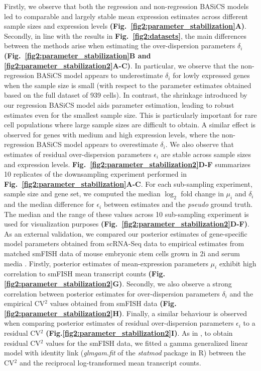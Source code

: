 Firstly, we observe that both the regression and non-regression BASiCS models led to comparable and largely stable mean expression estimates across different sample sizes and expression levels \textbf{(Fig.~\ref{fig2:parameter_stabilization}A)}. Secondly, in line with the results in \textbf{Fig.~\ref{fig2:datasets}}, the main differences between the methods arise when estimating the over-dispersion parameters $\delta_i$ \textbf{(Fig.~\ref{fig2:parameter_stabilization}B and \ref{fig2:parameter_stabilization2}A-C)}. In particular, we observe that the non-regression BASiCS model appears to underestimate $\delta_i$ for lowly expressed genes when the sample size is small (with respect to the parameter estimates obtained based on the full dataset of 939 cells). In contrast, the shrinkage introduced by our regression BASiCS model aids parameter estimation, leading to robust estimates even for the smallest sample size. This is particularly important for rare cell populations where large sample sizes are difficult to obtain. A similar effect is observed for genes with medium and high expression levels, where the non-regression BASiCS model appears to overestimate $\delta_i$. We also observe that estimates of residual over-dispersion parameters $\epsilon_i$ are stable across sample sizes and expression levels. \textbf{Fig.~\ref{fig2:parameter_stabilization2}D-F} summarizes 10 replicates of the downsampling experiment performed in \textbf{Fig.~\ref{fig2:parameter_stabilization}A-C}. For each sub-sampling experiment, sample size and gene set, we computed the median $\log_2$ fold change in $\mu_i$ and $\delta_i$ and the median difference for $\epsilon_i$ between estimates and the \emph{pseudo} ground truth. The median and the range of these values across 10 sub-sampling experiment is used for visualization purposes \textbf{(Fig.~\ref{fig2:parameter_stabilization2}D-F)}. \\

As an external validation, we compared our posterior estimates of gene-specific model parameters obtained from scRNA-Seq data to empirical estimates from matched smFISH data of mouse embryonic stem cells grown in 2i and serum media \citep{Grun2014}. Firstly, posterior estimates of mean-expression parameters $\mu_i$ exhibit high correlation to smFISH mean transcript counts \textbf{(Fig.\ref{fig2:parameter_stabilization2}G)}. Secondly, we also observe a strong correlation between posterior estimates for over-dispersion parameters $\delta_i$ and the empirical CV$^2$ values obtained from smFISH data \textbf{(Fig.\ref{fig2:parameter_stabilization2}H)}. Finally, a similar behaviour is observed when comparing posterior estimates of residual over-dispersion parameters $\epsilon_i$ to a residual CV$^2$ \textbf{(Fig.\ref{fig2:parameter_stabilization2}I)}. As in \cite{Brennecke2013}, to obtain residual CV$^2$ values for the smFISH data, we fitted a gamma generalized linear model with identity link (\textit{glmgam.fit} of the \textit{statmod} package in R) between the CV$^2$ and the reciprocal log-transformed mean transcript counts.


